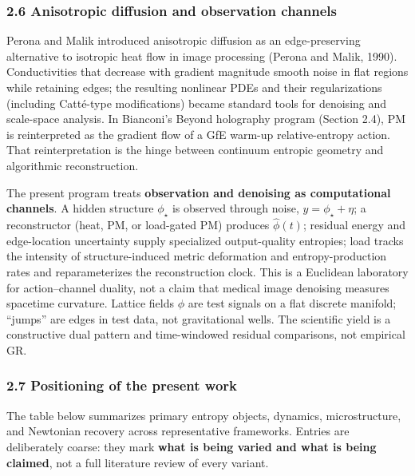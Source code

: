 \documentclass[
  11pt,
]{article}
\begin{document}
\subsubsection{2.6 Anisotropic diffusion and observation
channels}\label{anisotropic-diffusion-and-observation-channels}

Perona and Malik introduced anisotropic diffusion as an edge-preserving
alternative to isotropic heat flow in image processing (Perona and
Malik, 1990). Conductivities that decrease with gradient magnitude
smooth noise in flat regions while retaining edges; the resulting
nonlinear PDEs and their regularizations (including Catté-type
modifications) became standard tools for denoising and scale-space
analysis. In Bianconi's Beyond holography program (Section 2.4), PM is
reinterpreted as the gradient flow of a GfE warm-up relative-entropy
action. That reinterpretation is the hinge between continuum entropic
geometry and algorithmic reconstruction.

The present program treats \textbf{observation and denoising as
computational channels}. A hidden structure \(\phi_\star\) is observed
through noise, \(y=\phi_\star+\eta\); a reconstructor (heat, PM, or
load-gated PM) produces \(\hat\phi(t)\); residual energy and
edge-location uncertainty supply specialized output-quality entropies;
load tracks the intensity of structure-induced metric deformation and
entropy-production rates and reparameterizes the reconstruction clock.
This is a Euclidean laboratory for action--channel duality, not a claim
that medical image denoising measures spacetime curvature. Lattice
fields \(\phi\) are test signals on a flat discrete manifold; ``jumps''
are edges in test data, not gravitational wells. The scientific yield is
a constructive dual pattern and time-windowed residual comparisons, not
empirical GR.

\subsubsection{2.7 Positioning of the present
work}\label{positioning-of-the-present-work}

The table below summarizes primary entropy objects, dynamics,
microstructure, and Newtonian recovery across representative frameworks.
Entries are deliberately coarse: they mark \textbf{what is being varied
and what is being claimed}, not a full literature review of every
variant.
\end{document}
